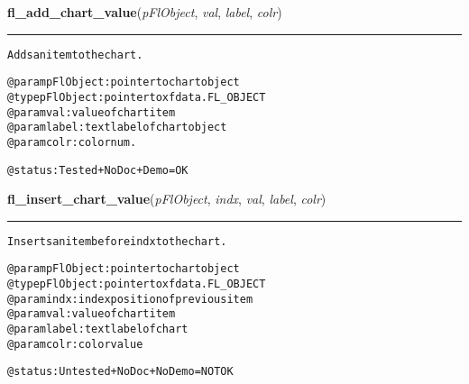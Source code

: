 \hspace{.8\funcindent}\begin{boxedminipage}{\funcwidth}

    \raggedright \textbf{fl\_add\_chart\_value}(\textit{pFlObject}, \textit{val}, \textit{label}, \textit{colr})

    \vspace{-1.5ex}

    \rule{\textwidth}{0.5\fboxrule}
\setlength{\parskip}{2ex}
\begin{alltt}
        Adds an item to the chart.

        @param pFlObject: pointer to chart object
@type pFlObject: pointer to xfdata.FL\_OBJECT
        @param val: value of chart item
        @param label: text label of chart object
        @param colr: color num.

        @status: Tested + NoDoc + Demo = OK
    
\end{alltt}

\setlength{\parskip}{1ex}
    \end{boxedminipage}

    \label{xformslib:flchart:fl_insert_chart_value}

    \vspace{0.5ex}

\hspace{.8\funcindent}\begin{boxedminipage}{\funcwidth}

    \raggedright \textbf{fl\_insert\_chart\_value}(\textit{pFlObject}, \textit{indx}, \textit{val}, \textit{label}, \textit{colr})

    \vspace{-1.5ex}

    \rule{\textwidth}{0.5\fboxrule}
\setlength{\parskip}{2ex}
\begin{alltt}
        Inserts an item before indx to the chart.

        @param pFlObject: pointer to chart object
@type pFlObject: pointer to xfdata.FL\_OBJECT
        @param indx: index position of previous item
        @param val: value of chart item
        @param label: text label of chart
        @param colr: color value

        @status: Untested + NoDoc + NoDemo = NOT OK
    
\end{alltt}

\setlength{\parskip}{1ex}
    \end{boxedminipage}

